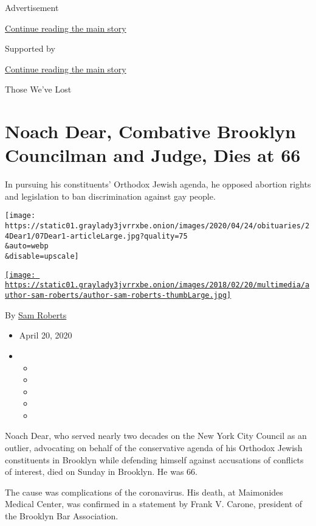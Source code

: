 Advertisement

\protect\hyperlink{after-top}{Continue reading the main story}

Supported by

\protect\hyperlink{after-sponsor}{Continue reading the main story}

Those We've Lost

\hypertarget{noach-dear-combative-brooklyn-councilman-and-judge-dies-at-66}{%
\section{Noach Dear, Combative Brooklyn Councilman and Judge, Dies at
66}\label{noach-dear-combative-brooklyn-councilman-and-judge-dies-at-66}}

In pursuing his constituents' Orthodox Jewish agenda, he opposed
abortion rights and legislation to ban discrimination against gay
people.

\texttt{[image: https://static01.graylady3jvrrxbe.onion/images/2020/04/24/obituaries/24Dear1/07Dear1-articleLarge.jpg?quality=75\\\&auto=webp\\\&disable=upscale]}

\href{https://www.nytimes3xbfgragh.onion/by/sam-roberts}{\texttt{[image: https://static01.graylady3jvrrxbe.onion/images/2018/02/20/multimedia/author-sam-roberts/author-sam-roberts-thumbLarge.jpg]}}

By \href{https://www.nytimes3xbfgragh.onion/by/sam-roberts}{Sam Roberts}

\begin{itemize}
\item
  April 20, 2020
\item
  \begin{itemize}
  \item
  \item
  \item
  \item
  \item
  \end{itemize}
\end{itemize}

Noach Dear, who served nearly two decades on the New York City Council
as an outlier, advocating on behalf of the conservative agenda of his
Orthodox Jewish constituents in Brooklyn while defending himself against
accusations of conflicts of interest, died on Sunday in Brooklyn. He was
66.

The cause was complications of the coronavirus. His death, at Maimonides
Medical Center, was confirmed in a statement by Frank V. Carone,
president of the Brooklyn Bar Association.

